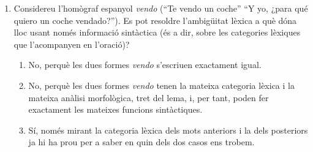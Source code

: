 \begin{enumerate}
\item Considereu l'homògraf espanyol \emph{vendo} (``Te vendo un
  coche'' ``Y yo, ¿para qué quiero un coche vendado?''). Es pot
  resoldre l'ambigüitat lèxica a què dóna lloc usant només informació
  sintàctica (és a dir, sobre les categories lèxiques que
  l'acompanyen en l'oració)?
\begin{enumerate}
\item No, perquè les dues formes \emph{vendo} s'escriuen exactament igual.
\item No, perquè les dues formes \emph{vendo} tenen la mateixa categoria
  lèxica i la mateixa anàlisi morfològica, tret del lema, i, per
  tant, poden fer exactament les mateixes funcions sintàctiques.
\item Sí, només mirant la categoria lèxica dels mots anteriors i la
  dels posteriors ja hi ha prou per a saber en quin dels dos casos ens trobem.
\end{enumerate}


\end{enumerate}
